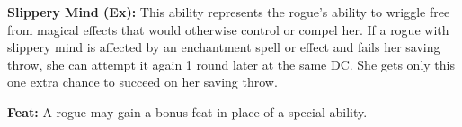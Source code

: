 \textbf{Slippery Mind (Ex):} This ability represents the rogue’s ability to wriggle free from magical effects that would otherwise control or compel her. If a rogue with slippery mind is affected by an enchantment spell or effect and fails her saving throw, she can attempt it again 1 round later at the same DC. She gets only this one extra chance to succeed on her saving throw.

\textbf{Feat:} A rogue may gain a bonus feat in place of a special ability.

